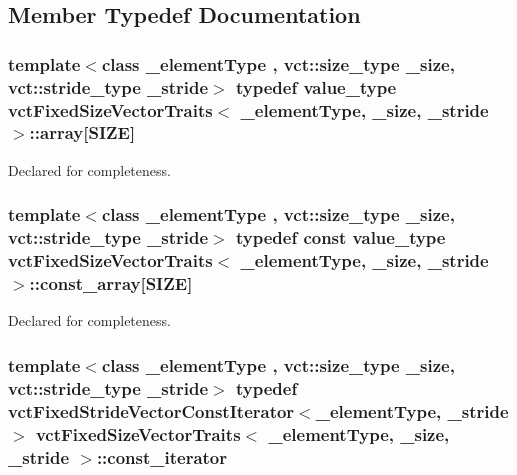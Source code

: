 \subsection{Member Typedef Documentation}
\hypertarget{classvct_fixed_size_vector_traits_ab86355023bee9fbca9ee14640c6b7f4e}{
\subsubsection[{array}]{\setlength{\rightskip}{0pt plus 5cm}template$<$class \-\_\-element\-Type , vct\-::size\-\_\-type \-\_\-size, vct\-::stride\-\_\-type \-\_\-stride$>$ typedef value\-\_\-type {\bf vct\-Fixed\-Size\-Vector\-Traits}$<$ \-\_\-element\-Type, \-\_\-size, \-\_\-stride $>$\-::array\mbox{[}{\bf S\-I\-Z\-E}\mbox{]}}}\label{classvct_fixed_size_vector_traits_ab86355023bee9fbca9ee14640c6b7f4e}
Declared for completeness. \hypertarget{classvct_fixed_size_vector_traits_acb808c545eef4de1bdcd7b8c4f71b1ce}{
\subsubsection[{const\-\_\-array}]{\setlength{\rightskip}{0pt plus 5cm}template$<$class \-\_\-element\-Type , vct\-::size\-\_\-type \-\_\-size, vct\-::stride\-\_\-type \-\_\-stride$>$ typedef const value\-\_\-type {\bf vct\-Fixed\-Size\-Vector\-Traits}$<$ \-\_\-element\-Type, \-\_\-size, \-\_\-stride $>$\-::const\-\_\-array\mbox{[}{\bf S\-I\-Z\-E}\mbox{]}}}\label{classvct_fixed_size_vector_traits_acb808c545eef4de1bdcd7b8c4f71b1ce}
Declared for completeness. \hypertarget{classvct_fixed_size_vector_traits_a9c7e38590e4a27350095e89a84dc0d09}{
\subsubsection[{const\-\_\-iterator}]{\setlength{\rightskip}{0pt plus 5cm}template$<$class \-\_\-element\-Type , vct\-::size\-\_\-type \-\_\-size, vct\-::stride\-\_\-type \-\_\-stride$>$ typedef {\bf vct\-Fixed\-Stride\-Vector\-Const\-Iterator}$<$\-\_\-element\-Type, \-\_\-stride$>$ {\bf vct\-Fixed\-Size\-Vector\-Traits}$<$ \-\_\-element\-Type, \-\_\-size, \-\_\-stride $>$\-::{\bf const\-\_\-iterator}}}\label{classvct_fixed_size_vector_traits_a9c7e38590e4a27350095e89a84dc0d09}
